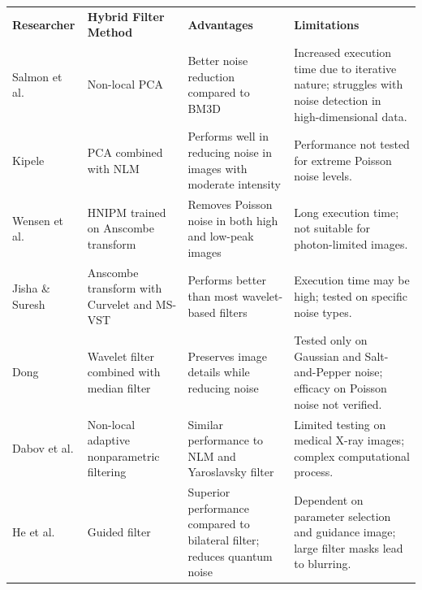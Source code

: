 \begin{center}
\small
\setlength{\arrayrulewidth}{1mm} %
\setlength{\tabcolsep}{6pt} %
\renewcommand{\arraystretch}{1.5} %

\begin{longtable}{ p{}  p{}  p{}  p{} }
\rowcolor[HTML]{D3D3D3} 
\textbf{Researcher} & \textbf{Hybrid Filter Method} & \textbf{Advantages} & \textbf{Limitations} \\
\rowcolor[HTML]{FFFFFF} 
Salmon et al. \cite{salmon2014poisson} & Non-local \gls{PCA} & Better noise reduction compared to \gls{BM3D} & Increased execution time due to iterative nature; struggles with noise detection in high-dimensional data. \\
\rowcolor[HTML]{F3F3F3} 
Kipele \cite{kipele_poisson_2023} & \gls{PCA} combined with \gls{NLM} & Performs well in reducing noise in images with moderate intensity & Performance not tested for extreme Poisson noise levels. \\
\rowcolor[HTML]{FFFFFF} 
Wensen et al. \cite{doi:10.1137/16M1072930} & \gls{HNIPM} trained on \gls{Anscombe transform} & Removes Poisson noise in both high and low-peak images & Long execution time; not suitable for photon-limited images. \\
\rowcolor[HTML]{F3F3F3} 
Jisha \& Suresh \cite{jisha2014poisson} & \gls{Anscombe transform} with Curvelet and \gls{MS-VST} & Performs better than most wavelet-based filters & Execution time may be high; tested on specific noise types. \\
\rowcolor[HTML]{FFFFFF} 
Dong \cite{dong_x-ray_2020} & Wavelet filter combined with median filter & Preserves image details while reducing noise & Tested only on Gaussian and Salt-and-Pepper noise; efficacy on Poisson noise not verified. \\
\rowcolor[HTML]{F3F3F3} 
Dabov et al. \cite{4271520} & Non-local adaptive nonparametric filtering & Similar performance to \gls{NLM} and \gls{Yaroslavsky filter} & Limited testing on medical X-ray images; complex computational process. \\
\rowcolor[HTML]{FFFFFF} 
He et al. \cite{6319316} & Guided filter & Superior performance compared to bilateral filter; reduces quantum noise & Dependent on parameter selection and guidance image; large filter masks lead to blurring. \\

\end{longtable}
\end{center}
